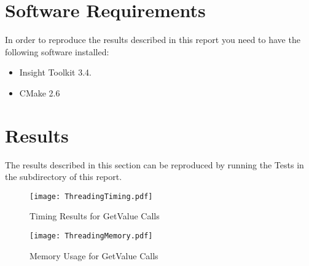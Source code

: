 \documentclass{InsightArticle}
\begin{document}
\section{Software Requirements}

In order to reproduce the results described in this report you need to have the
following software installed:

\begin{itemize}
  \item  Insight Toolkit 3.4.
  \item  CMake 2.6
\end{itemize}


\appendix

\section{Results}

The results described in this section can be reproduced by running the Tests in
the  subdirectory of this report.

\begin{figure}[ht]
\centering
\texttt{[image: ThreadingTiming.pdf]}
\caption{Timing Results for GetValue Calls}
\label{fig:GetValueTiming}
\end{figure}

\begin{figure}[ht]
\centering
\texttt{[image: ThreadingMemory.pdf]}
\label{fig:GetValueMemory}
\caption{Memory Usage for GetValue Calls}
\end{figure}



\end{document}
